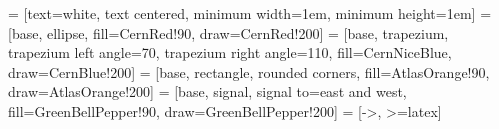 \newlength{\figurewidth}
\setlength{\figurewidth}{\linewidth}

\newlength{\subfigurewidth}
\setlength{\subfigurewidth}{0.5\textwidth}

\newcommand{\tstack}[2]{$\substack{\text{\normalsize #1}\\\text{\tiny #2}}$} %

\newcommand{\mytopmargin}[1]{\newgeometry{top=3cm}#1\restoregeometry}
\newcommand{\tinytopmargin}[1]{\newgeometry{top=1cm}#1\restoregeometry}

\newcommand{\tmpcapskip}[1]{
    \setlength{\abovecaptionskip}{5pt}
    \setlength{\belowcaptionskip}{5pt}
    #1
    \setlength{\abovecaptionskip}{10pt}
    \setlength{\belowcaptionskip}{0pt}
}

\newcommand{\todo}[1]{{\color[RGB]{190, 130, 130} \textbf{TODO }\textit{#1}}}
\newcommand{\of}[1]{\left(#1\right)}    %
\newcommand{\E}[1]{\cdot 10^{#1}}
\newcommand{\bone}{\textcolor{blue}{Beam 1}}
\newcommand{\btwo}{\textcolor{red}{Beam 2}}


\usetikzlibrary{arrows, shapes, calc, positioning}
 = [text=white, text centered, minimum width=1em, minimum height=1em]
 = [base, ellipse, fill=CernRed!90, draw=CernRed!200]
 = [base, trapezium, trapezium left angle=70, trapezium right angle=110, fill=CernNiceBlue, draw=CernBlue!200]
 = [base, rectangle, rounded corners, fill=AtlasOrange!90, draw=AtlasOrange!200]
 = [base, signal, signal to=east and west, fill=GreenBellPepper!90, draw=GreenBellPepper!200]
 = [->, >=latex]

\newcommand\drawRect[5]{%
    \def\top{#1}
    \def\left{#2}
    \def\right{#3}
    \def\bottom{#4}
    \begin{tikzpicture}[remember picture, overlay]
        \draw[#5, thick] (\left,\top) -- (\right,\top) -- (\right,\bottom) -- (\left,\bottom) -- cycle;    
    \end{tikzpicture}
}


